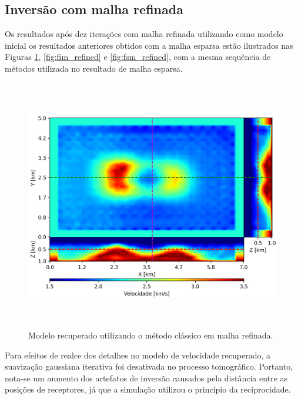 \subsection*{Inversão com malha refinada}

Os resultados após dez iterações com malha refinada utilizando como modelo inicial os resultados anteriores obtidos com a malha esparsa estão ilustrados nas Figuras \ref{fig:pod_refined}, \ref{fig:fim_refined} e \ref{fig:fsm_refined}, com a mesma sequência de métodos utilizada no resultado de malha esparsa.

\begin{figure}[H]
	\centering
	\includegraphics[width=16cm,height=11cm]{Imgs/Resultados/pod_refined.png}
	\caption{Modelo recuperado utilizando o método clássico em malha refinada.}
	\label{fig:pod_refined}	
\end{figure}

Para efeitos de realce dos detalhes no modelo de velocidade recuperado, a suavização gaussiana iterativa foi desativada no processo tomográfico. Portanto, nota-se um aumento dos artefatos de inversão causados pela distância entre as posições de receptores, já que a simulação utilizou o princípio da reciprocidade.    

